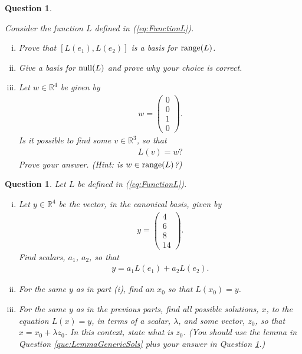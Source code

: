 \documentclass[12pt]{article}
\newtheorem{question}[thm]{Question}
\def\real{{\mathbb R}}
\def\NullLA{\textnormal{null}}
\def\range{\textnormal{range}}
\def\lam{\lambda}
\newcommand{\ColVecFour}[4]{\begin{pmatrix} #1\\ #2\\#3 \\ #4\end{pmatrix}}
\begin{document}
\begin{question}\label{que:RangeAndNullMatrixL}
	\normalfont
	
	Consider the function $L$ defined in (\ref{eq:FunctionL}).
	
	\begin{enumerate}[(i)]
		\item Prove that $[L(e_1), L(e_2)]$ is a basis for $\range(L)$.
		
		\item Give a basis for $\NullLA(L)$ and prove why your choice is correct.
		
		\item Let $w\in\real^4$ be given by
		\begin{align*}
			w = \ColVecFour{0}{0}{1}{0}.
		\end{align*}
		Is it possible to find some $v\in\real^3$, so that
		\begin{align*}
			L(v)=w?
		\end{align*}
		Prove your answer. (Hint: is $w\in\range(L)$?)
	\end{enumerate}
	
	
	
\end{question}
	
	
	\vspace{1cm}
	


\begin{question}
	\normalfont
	Let $L$ be defined in (\ref{eq:FunctionL}).
	
	\begin{enumerate}[(i)]
		
		
		\item Let $y\in\real^4$ be the vector, in the canonical basis, given by
		\begin{align*}
			y=\ColVecFour{4}{6}{8}{14}.
		\end{align*}
		Find scalars, $a_1$, $a_2$, so that
		\begin{align*}
			y= a_1L(e_1) + a_2 L(e_2).
		\end{align*}
		 
		\item For the same $y$ as in part (i), find an $x_0$ so that $L(x_0)=y$.
		\item For the same $y$ as in the previous parts, find all possible solutions, $x$, to the equation $L(x)=y$, in terms of a scalar, $\lam$, and some vector, $z_0$, so that $x=x_0+\lam z_0$.  In this context, state what is $z_0$.  (You should use the lemma in Question \ref{que:LemmaGenericSols} plus your answer in Question \ref{que:RangeAndNullMatrixL}.)  
	
	\end{enumerate}
\end{question}
\end{document}
